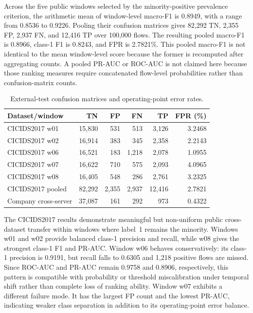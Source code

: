 \documentclass[11pt,fleqn]{report}
\begin{document}
Across the five public windows selected by the minority-positive prevalence criterion, the arithmetic mean of window-level macro-F1 is 0.8949, with a range from 0.8536 to 0.9226. Pooling their confusion matrices gives 82,292 TN, 2,355 FP, 2,937 FN, and 12,416 TP over 100,000 flows. The resulting pooled macro-F1 is 0.8966, class-1 F1 is 0.8243, and FPR is 2.7821\%. This pooled macro-F1 is not identical to the mean window-level score because the former is recomputed after aggregating counts. A pooled PR-AUC or ROC-AUC is not claimed here because those ranking measures require concatenated flow-level probabilities rather than confusion-matrix counts.

\begin{table}[H]
    \centering
    \caption{External-test confusion matrices and operating-point error rates.}
    \label{tab:results_external_errors}
    \begin{tabular}{@{}lrrrrr@{}}
        \toprule
        Dataset/window & TN & FP & FN & TP & FPR (\%) \\
        \midrule
        CICIDS2017 w01 & 15,830 & 531 & 513 & 3,126 & 3.2468 \\
        CICIDS2017 w02 & 16,914 & 383 & 345 & 2,358 & 2.2143 \\
        CICIDS2017 w06 & 16,521 & 183 & 1,218 & 2,078 & 1.0955 \\
        CICIDS2017 w07 & 16,622 & 710 & 575 & 2,093 & 4.0965 \\
        CICIDS2017 w08 & 16,405 & 548 & 286 & 2,761 & 3.2325 \\
        \midrule
        CICIDS2017 pooled & 82,292 & 2,355 & 2,937 & 12,416 & 2.7821 \\
        Company cross-server & 37,087 & 161 & 292 & 973 & 0.4322 \\
        \bottomrule
    \end{tabular}
\end{table}

The CICIDS2017 results demonstrate meaningful but non-uniform public cross-dataset transfer within windows where label~1 remains the minority. Windows w01 and w02 provide balanced class-1 precision and recall, while w08 gives the strongest class-1 F1 and PR-AUC. Window w06 behaves conservatively: its class-1 precision is 0.9191, but recall falls to 0.6305 and 1,218 positive flows are missed. Since ROC-AUC and PR-AUC remain 0.9758 and 0.8906, respectively, this pattern is compatible with probability or threshold miscalibration under temporal shift rather than complete loss of ranking ability. Window w07 exhibits a different failure mode. It has the largest FP count and the lowest PR-AUC, indicating weaker class separation in addition to its operating-point error balance.
\end{document}
